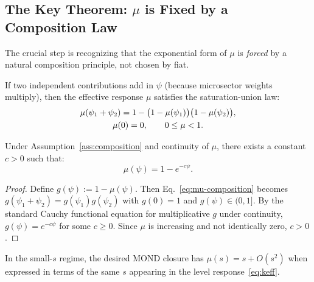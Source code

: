\subsection{The Key Theorem: $\mu$ is Fixed by a Composition Law}

The crucial step is recognizing that the exponential form of $\mu$ is \textit{forced} by a natural composition principle, not chosen by fiat.

\begin{assumption}\label{ass:composition}
If two independent contributions add in $\psi$ (because microsector weights multiply), then the effective response $\mu$ satisfies the saturation-union law:
\begin{gather}
\mu(\psi_1 + \psi_2) = 1 - \bigl(1 - \mu(\psi_1)\bigr)\bigl(1 - \mu(\psi_2)\bigr),
\label{eq:mu-composition}\\
\mu(0) = 0, \qquad 0 \leq \mu < 1. \notag
\end{gather}
\end{assumption}

\begin{lemma}\label{lem:mu-exponential}
Under Assumption~\ref{ass:composition} and continuity of $\mu$, there exists a constant $c > 0$ such that:
\begin{equation}
\mu(\psi) = 1 - e^{-c\psi}.
\label{eq:mu-exp}
\end{equation}
\end{lemma}

\begin{proof}
Define $g(\psi) := 1 - \mu(\psi)$. Then Eq.~\eqref{eq:mu-composition} becomes $g(\psi_1 + \psi_2) = g(\psi_1)g(\psi_2)$ with $g(0) = 1$ and $g(\psi) \in (0,1]$. By the standard Cauchy functional equation for multiplicative $g$ under continuity, $g(\psi) = e^{-c\psi}$ for some $c \geq 0$. Since $\mu$ is increasing and not identically zero, $c > 0$.
\end{proof}

\begin{assumption}\label{ass:slope}
In the small-$s$ regime, the desired MOND closure has $\mu(s) = s + O(s^2)$ when expressed in terms of the same $s$ appearing in the level response~\eqref{eq:keff}.
\end{assumption}

